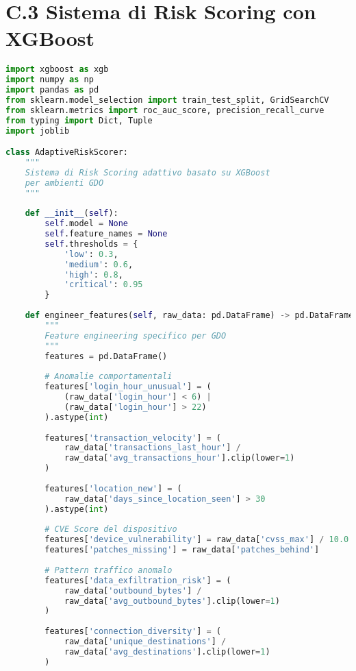 \section{\texorpdfstring{\textbf{C.3 Sistema di Risk Scoring con XGBoost}}{C.3 - Sistema di Risk Scoring con XGBoost}}

\begin{lstlisting}[language=Python, caption=Implementazione Risk Scoring adattivo con XGBoost]
import xgboost as xgb
import numpy as np
import pandas as pd
from sklearn.model_selection import train_test_split, GridSearchCV
from sklearn.metrics import roc_auc_score, precision_recall_curve
from typing import Dict, Tuple
import joblib

class AdaptiveRiskScorer:
    """
    Sistema di Risk Scoring adattivo basato su XGBoost
    per ambienti GDO
    """
    
    def __init__(self):
        self.model = None
        self.feature_names = None
        self.thresholds = {
            'low': 0.3,
            'medium': 0.6,
            'high': 0.8,
            'critical': 0.95
        }
        
    def engineer_features(self, raw_data: pd.DataFrame) -> pd.DataFrame:
        """
        Feature engineering specifico per GDO
        """
        features = pd.DataFrame()
        
        # Anomalie comportamentali
        features['login_hour_unusual'] = (
            (raw_data['login_hour'] < 6) | 
            (raw_data['login_hour'] > 22)
        ).astype(int)
        
        features['transaction_velocity'] = (
            raw_data['transactions_last_hour'] / 
            raw_data['avg_transactions_hour'].clip(lower=1)
        )
        
        features['location_new'] = (
            raw_data['days_since_location_seen'] > 30
        ).astype(int)
        
        # CVE Score del dispositivo
        features['device_vulnerability'] = raw_data['cvss_max'] / 10.0
        features['patches_missing'] = raw_data['patches_behind']
        
        # Pattern traffico anomalo
        features['data_exfiltration_risk'] = (
            raw_data['outbound_bytes'] / 
            raw_data['avg_outbound_bytes'].clip(lower=1)
        )
        
        features['connection_diversity'] = (
            raw_data['unique_destinations'] / 
            raw_data['avg_destinations'].clip(lower=1)
        )
        

\end{lstlisting}
